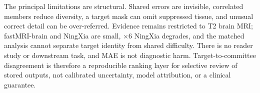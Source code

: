 \documentclass{article}
\begin{document}
The principal limitations are structural. Shared errors are invisible, correlated members reduce diversity, a target mask can omit suppressed tissue, and unusual correct detail can be over-referred. Evidence remains restricted to T2 brain MRI; fastMRI-brain and NingXia are small, $\times6$ NingXia degrades, and the matched analysis cannot separate target identity from shared difficulty. There is no reader study or downstream task, and MAE is not diagnostic harm. Target-to-committee disagreement is therefore a reproducible ranking layer for selective review of stored outputs, not calibrated uncertainty, model attribution, or a clinical guarantee.

\clearpage


\end{document}

